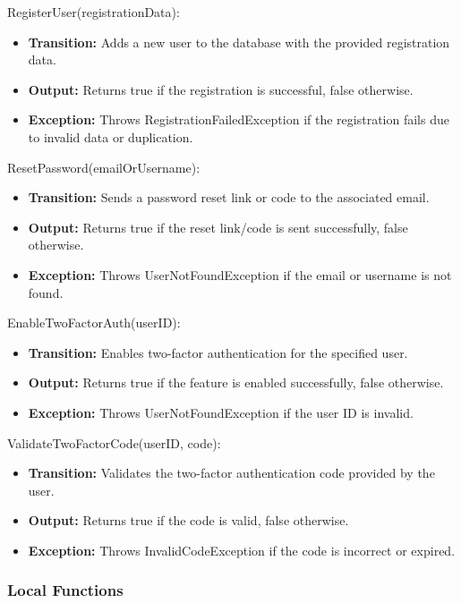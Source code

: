 \documentclass[12pt, titlepage]{article}
\begin{document}
\noindent RegisterUser(registrationData):
\begin{itemize}
    \item \textbf{Transition:} Adds a new user to the database with the provided registration data.
    \item \textbf{Output:} Returns true if the registration is successful, false otherwise.
    \item \textbf{Exception:} Throws RegistrationFailedException if the registration fails due to invalid data or duplication.
\end{itemize}

\noindent ResetPassword(emailOrUsername):
\begin{itemize}
    \item \textbf{Transition:} Sends a password reset link or code to the associated email.
    \item \textbf{Output:} Returns true if the reset link/code is sent successfully, false otherwise.
    \item \textbf{Exception:} Throws UserNotFoundException if the email or username is not found.
\end{itemize}

\noindent EnableTwoFactorAuth(userID):
\begin{itemize}
    \item \textbf{Transition:} Enables two-factor authentication for the specified user.
    \item \textbf{Output:} Returns true if the feature is enabled successfully, false otherwise.
    \item \textbf{Exception:} Throws UserNotFoundException if the user ID is invalid.
\end{itemize}

\noindent ValidateTwoFactorCode(userID, code):
\begin{itemize}
    \item \textbf{Transition:} Validates the two-factor authentication code provided by the user.
    \item \textbf{Output:} Returns true if the code is valid, false otherwise.
    \item \textbf{Exception:} Throws InvalidCodeException if the code is incorrect or expired.
\end{itemize}

\subsubsection{Local Functions}
\end{document}
